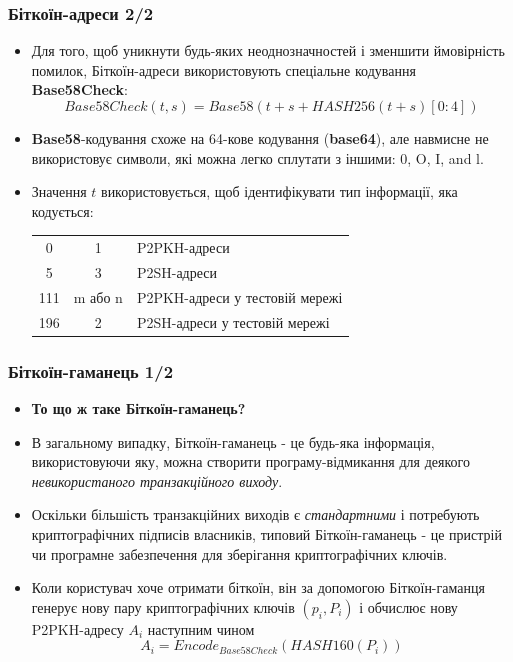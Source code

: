 \documentclass{beamer}
\begin{document}
\begin{frame}[fragile]
  \frametitle{Біткоїн-адреси 2/2}
  \begin{itemize}
  \item Для того, щоб уникнути будь-яких неоднозначностей і зменшити ймовірність
    помилок, Біткоїн-адреси використовують спеціальне кодування \textbf{Base58Check}:
    $$Base58Check(t, s) = Base58(t + s + HASH256(t + s)[0:4])$$
  \item \textbf{Base58}-кодування схоже на 64-кове кодування (\textbf{base64}),
    але навмисне не використовує символи, які можна легко сплутати з іншими: 0,
    O, I, and l.
  \item Значення $t$ використовується, щоб ідентифікувати тип інформації, яка
    кодується: \break
    \begin{tabular}{ccl}
      0 & 1 & P2PKH-адреси \\
      5 & 3 & P2SH-адреси \\
      111 & m або n & P2PKH-адреси у тестовій мережі \\
      196 & 2 & P2SH-адреси у тестовій мережі \\
    \end{tabular}
  \end{itemize}
\end{frame}

\begin{frame}[fragile]
  \frametitle{Біткоїн-гаманець 1/2}
  \begin{itemize}
  \item \textbf{То що ж таке Біткоїн-гаманець?}
  \item В загальному випадку, Біткоїн-гаманець - це будь-яка інформація,
    використовуючи яку, можна створити програму-відмикання для деякого
    \textit{невикористаного транзакційного виходу}.
  \item Оскільки більшість транзакційних виходів є \textit{стандартними} і
    потребують криптографічних підписів власників, типовий Біткоїн-гаманець - це
    пристрій чи програмне забезпечення для зберігання криптографічних ключів.
  \item Коли користувач хоче отримати біткоїн, він за допомогою Біткоїн-гаманця
    генерує нову пару криптографічних ключів $(p_i, P_i)$ і обчислює нову
    P2PKH-адресу $A_i$ наступним чином
    $$A_i = Encode_{Base58Check}(HASH160(P_i))$$
  \end{itemize}
\end{frame}
\end{document}
